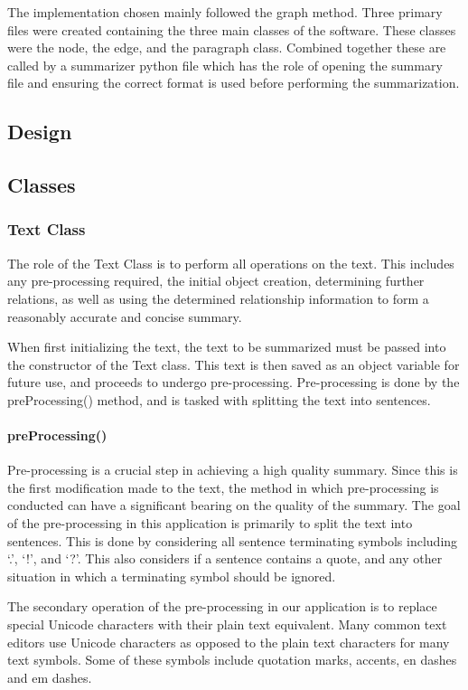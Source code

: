 

The implementation chosen mainly followed the graph method. Three primary files were created containing the three main classes of the software. These classes were the node, the edge, and the paragraph class. Combined together these are called by a summarizer python file which has the role of opening the summary file and ensuring the correct format is used before performing the summarization.

\subsection{Design}



\subsection{Classes}
	\subsubsection{Text Class}
	The role of the Text Class is to perform all operations on the text. This includes any pre-processing required, the initial object creation, determining further relations, as well as using the determined relationship information to form a reasonably accurate and concise summary.
	
	When first initializing the text, the text to be summarized must be passed into the constructor of the Text class. This text is then saved as an object variable for future use, and proceeds to undergo pre-processing. Pre-processing is done by the preProcessing() method, and is tasked with splitting the text into sentences.
	
	\paragraph{preProcessing()}
		Pre-processing is a crucial step in achieving a high quality summary. Since this is the first modification made to the text, the method in which pre-processing is conducted can have a significant bearing on the quality of the summary. The goal of the pre-processing in this application is primarily to split the text into sentences. This is done by considering all sentence terminating symbols including `.', `!', and `?'. This also considers if a sentence contains a quote, and any other situation in which a terminating symbol should be ignored.
		
		The secondary operation of the pre-processing in our application is to replace special Unicode characters with their plain text equivalent. Many common text editors use Unicode characters as opposed to the plain text characters for many text symbols. Some of these symbols include quotation marks, accents, en dashes and em dashes.
		
